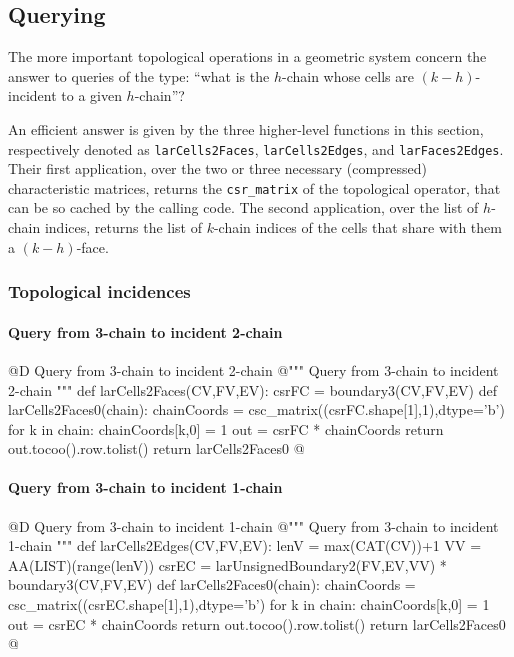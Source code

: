 \documentclass[11pt,oneside]{article}	%
\begin{document}
\subsection{Querying}

The more important topological operations in a geometric system concern the answer to queries of the type: ``what is the $h$-chain whose cells are $(k-h)$-incident to a given $h$-chain''?

An efficient answer is given by the three higher-level functions in this section, respectively denoted as \texttt{larCells2Faces}, \texttt{larCells2Edges}, and \texttt{larFaces2Edges}.
Their first application, over the two or three necessary (compressed) characteristic matrices, returns the \texttt{csr\_matrix} of the topological operator, that can be so cached by the calling code.
The second application, over the list of $h$-chain indices, returns the list of $k$-chain indices of the cells that share with them a $(k-h)$-face.


\subsubsection{Topological incidences}


\paragraph{Query from 3-chain to incident 2-chain}
@D Query from 3-chain to incident 2-chain
@{""" Query from 3-chain to incident 2-chain """
def larCells2Faces(CV,FV,EV):
    csrFC = boundary3(CV,FV,EV)
    def larCells2Faces0(chain):
        chainCoords = csc_matrix((csrFC.shape[1],1),dtype='b')
        for k in chain: chainCoords[k,0] = 1
        out = csrFC * chainCoords
        return out.tocoo().row.tolist()
    return larCells2Faces0
@}

\paragraph{Query from 3-chain to incident 1-chain}
@D Query from 3-chain to incident 1-chain
@{""" Query from 3-chain to incident 1-chain """
def larCells2Edges(CV,FV,EV):
    lenV = max(CAT(CV))+1
    VV = AA(LIST)(range(lenV))
    csrEC = larUnsignedBoundary2(FV,EV,VV) * boundary3(CV,FV,EV)
    def larCells2Faces0(chain):
        chainCoords = csc_matrix((csrEC.shape[1],1),dtype='b')
        for k in chain: chainCoords[k,0] = 1
        out = csrEC * chainCoords
        return out.tocoo().row.tolist()
    return larCells2Faces0
@}
\end{document}
